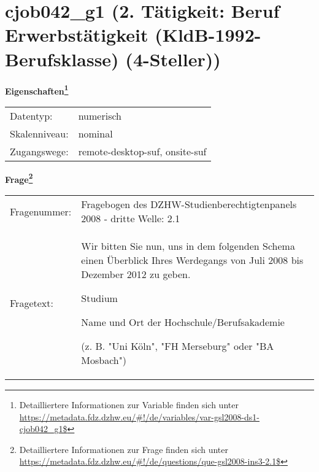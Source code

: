 
    \setcounter{footnote}{0}

    \vspace*{-1.8cm}
	\section{cjob042\_g1 (2. Tätigkeit: Beruf Erwerbstätigkeit (KldB-1992-Berufsklasse) (4-Steller))}
	\label{section:cjob042_g1}



    \vspace*{0.5cm}
    \noindent\textbf{Eigenschaften\footnote{Detailliertere Informationen zur Variable finden sich unter
		\url{https://metadata.fdz.dzhw.eu/\#!/de/variables/var-gsl2008-ds1-cjob042_g1$}}}\\
	\begin{tabularx}{\hsize}{@{}lX}
	Datentyp: & numerisch \\
	Skalenniveau: & nominal \\
	Zugangswege: &
	  remote-desktop-suf, 
	  onsite-suf
 \\
    \end{tabularx}



				\vspace*{0.5cm}
                \noindent\textbf{Frage\footnote{Detailliertere Informationen zur Frage finden sich unter
		              \url{https://metadata.fdz.dzhw.eu/\#!/de/questions/que-gsl2008-ins3-2.1$}}}\\
				\begin{tabularx}{\hsize}{@{}lX}
					Fragenummer: &
					  Fragebogen des DZHW-Studienberechtigtenpanels 2008 - dritte Welle:
					  2.1
 \\
					Fragetext: & Wir bitten Sie nun, uns in dem folgenden Schema einen Überblick Ihres Werdegangs von Juli 2008 bis Dezember 2012 zu geben.\par  Studium\par  Name und Ort der Hochschule/Berufsakademie\par  (z. B. "Uni Köln", "FH Merseburg" oder "BA Mosbach") \\
				\end{tabularx}





